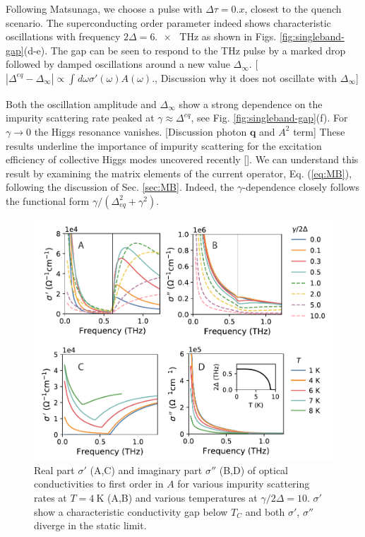 \documentclass[aps,prb,reprint,noeprint,superscriptaddress]{revtex4-1}
\begin{document}
Following Matsunaga, we choose a pulse with $\Delta \tau = 0.x$, closest to the
quench scenario. The superconducting order parameter indeed shows characteristic
oscillations with frequency $2\Delta=\SI{6.x}{\tera\hertz}$ as shown in Figs.
\ref{fig:singleband-gap}(d-e). The gap can be seen to respond to the THz pulse
by a marked drop followed by damped oscillations around a new value
$\Delta_{\infty}$. [$\left|\Delta^{eq}-\Delta_{\infty}\right| \propto
  \int_{}^{}d\omega \sigma'(\omega) A(\omega).$, 
Discussion why it does not oscillate with $\Delta_{\infty}$] 

Both the oscillation amplitude and $\Delta_{\infty}$ show a
strong dependence on the impurity scattering rate peaked at $\gamma\approx
\Delta^{eq}$, see Fig. \ref{fig:singleband-gap}(f). For $\gamma\rightarrow 0$
the Higgs resonance vanishes. [Discussion photon $\mathbf{q}$ and $A^2$ term] These results underline the
importance of impurity scattering for the excitation efficiency of collective
Higgs modes uncovered recently [].
We can understand this result by examining the matrix elements of the current
operator, Eq. (\ref{eq:MB}), following the discussion of Sec. \ref{sec:MB}.
Indeed, the $\gamma$-dependence closely follows
the functional form $\gamma/(\Delta_{eq}^2+\gamma^2)$.


\begin{figure}[t]
	\centering
	\includegraphics[width=\columnwidth]{figures/fig2.pdf}
	\caption{Real part $\sigma'$ (A,C) and imaginary part $\sigma''$ (B,D)
		of optical conductivities to first order in $A$ 
	for various impurity scattering rates at $T=\SI{4}{\kelvin}$ (A,B) and
various temperatures at $\gamma/2\Delta=10$. $\sigma'$ show a characteristic
conductivity gap below $T_C$ and both $\sigma'$, $\sigma''$ diverge in the
static limit.}
\label{fig:cond-lin}
\end{figure}
\end{document}
